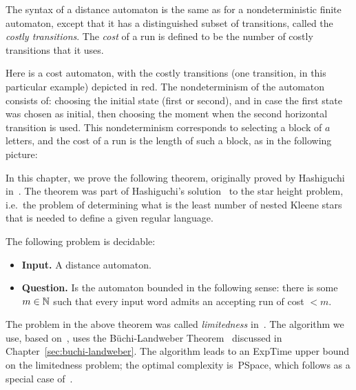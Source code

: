 The syntax of a distance automaton is the same as for a nondeterministic finite automaton, except that it has a distinguished subset of transitions, called the \emph{costly transitions}. The \emph{cost} of a run is defined to be the number of costly transitions that it uses. 

\begin{example}
	Here is a cost automaton, with the costly transitions (one transition, in this particular example) depicted in red.
	The nondeterminism of the automaton consists of: choosing the initial state (first or second), and in case the first state was chosen as initial, then choosing the moment when the second horizontal transition is used. This nondeterminism corresponds to selecting a block of $a$ letters, and the cost of a run is the length of such a block, as in the following picture:
\end{example}

In this chapter, we prove the following theorem, originally proved by Hashiguchi in~\cite{Hashiguchi:1982js}. The theorem was part of Hashiguchi's solution~\cite{Hashiguchi:1988eu} to the star height problem, i.e.~the problem of determining what is the least number of nested Kleene stars that is needed to define a given regular language.

\begin{theorem}
The following problem is decidable:
\begin{itemize}
	\item {\bf Input.} A distance automaton.
\item {\bf Question.} Is the automaton bounded in the following sense: there is some $m \in \mathbb{N}$ such  that every input word admits an accepting run of cost  $<m$.
\end{itemize}	
\end{theorem}

The problem in the above theorem was called  \emph{limitedness} in~\cite{Hashiguchi:1982js}. The algorithm we use, based on~\cite{Bojanczyk:2015hk}, uses the Büchi-Landweber Theorem~\cite{Buchi:1969iq} discussed in Chapter~\ref{sec:buchi-landweber}. The algorithm leads to an {\sc ExpTime} upper bound on the limitedness problem; the optimal complexity is~{\sc PSpace}, which follows as a special case of~\cite[Theorem 2.2]{Kirsten:2005fm}.



